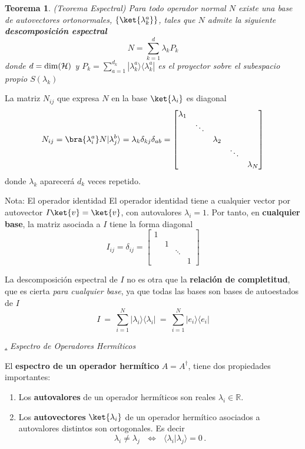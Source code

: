 \documentclass[a4paper,11pt]{book} %
\newtheorem{teorema_contador}{Teorema}
\newcommand{\Teorema}[1]{
		\begin{mybox_gray2}{}
			\begin{teorema_contador}
				 #1 
			\end{teorema_contador} 
		\end{mybox_gray2}
	}
\numberwithin{equation}{chapter}
\newcommand{\ketnew}[1]{|#1\rangle}
\newcommand{\braket}[2]{\langle #1|#2\rangle}
\newcommand{\ketbra}[2]{| #1\rangle \! \langle #2|}
\def\subsubiContadorIt{\par\addtocounter{subsubsection}{1}\underline{\it\thesubsubsection.}\hskip0.5cm \setcounter{subsubsubsectionIt}{0}}
\newcommand{\SubsubiIt}[1]{
		\subsubiContadorIt \textit{#1}
	}
\newcounter{subsubsubsectionIt}[subsubsection]
\begin{document}
	\Teorema{ (\textit{Teorema Espectral}) 
	Para todo operador normal $N$ existe una base de  autovectores ortonormales,  $\{\ket{\lambda^a_k}\}$,  tales que  $N$ admite la siguiente  \textbf{descomposición espectral }
	\begin{equation}
	N = \sum_{k=1}^d \lambda_k   P_k
	\end{equation} 
donde $d=  {\rm dim}(\mathcal{H})$ y $P_k = \sum_{a=1}^{d_k} \ketbra{\lambda^a_k}{\lambda^a_k}$ es el proyector sobre el subespacio propio $S(\lambda_k)$
	}
La matriz $N_{ij}$ que expresa $N$ en la base $\ket{\lambda_i}$ es diagonal 
$$
N_{ij} = \bra{\lambda^a_i} N\ketnew{\lambda^b_j} =  \lambda_k \delta_{kj} \delta_{ab} =\begin{bmatrix} \lambda_1 &  &  &  &  \\ & \ddots & & & \\ & & \lambda_2 & &  \\&  & & \ddots & \\  & & & &  \lambda_N \end{bmatrix}
$$
donde $\lambda_k$ aparecerá $d_k$ veces repetido.

	\begin{mybox_blue}{Nota: El operador identidad}
	El operador identidad tiene a cualquier vector por autovector $ I\ket{v} = \ket{v}$, con autovalores $\lambda_ i = 1$. Por tanto, en \textbf{cualquier base}, la matriz asociada a $I$ tiene la forma diagonal
	$$
	I_{ij} = \delta_{ij} = \begin{bmatrix} 1 &  &  &  \\ & 1 & &  \\ & & \ddots & \\ & & &  1 \end{bmatrix}
	$$

	La descomposición espectral de $I$ no es otra que la \textbf{relación de completitud}, que es cierta \textit{para cualquier base}, ya que todas las bases son bases de autoestados de $I$
	$$
	I ~=~ \sum_{i=1}^N \ketbra{\lambda_i}{\lambda_i} ~=~ \sum_{i=1}^N \ketbra{e_i}{e_i}
	$$	
	\end{mybox_blue}

			\SubsubiIt{Espectro de Operadores Hermíticos}

\begin{mybox_gray2}{}
El \textbf{espectro de un operador hermítico}  $A = A^\dagger$,  tiene dos propiedades importantes:
\begin{enumerate}
	\item Los \textbf{autovalores} de un operador hermíticos son reales $\lambda_i \in {\mathbb R}$.
	\item Los \textbf{autovectores} $\ket{\lambda_i}$ de un operador hermítico asociados a autovalores distintos son ortogonales. Es decir
	\begin{equation} \label{ec_op_hermitico_autovec_ortogonal}
	\lambda_i\neq \lambda_j ~~~\Longleftrightarrow ~~~\braket{\lambda_i}{\lambda_j} = 0\, .
	\end{equation}
\end{enumerate} 

\end{mybox_gray2}
\end{document}
